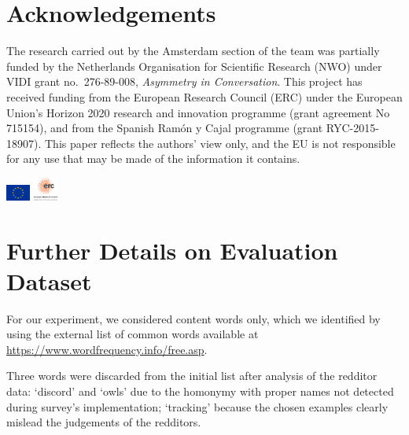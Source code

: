 \documentclass[11pt,a4paper]{article}
\begin{document}
\section*{Acknowledgements}
The research carried out by the Amsterdam section of the team was partially funded by the Netherlands Organisation for Scientific Research (NWO) under VIDI grant no.~276-89-008, {\em Asymmetry in Conversation}.
This project has received funding from the European Research Council (ERC) under the European Union’s Horizon 2020 research and innovation programme (grant agreement No 715154), and from the Spanish Ram\'on y Cajal programme (grant RYC-2015-18907). This paper reflects the authors' view only, and the EU is not responsible for any use that may be made of the information it contains.
\begin{flushright}
\includegraphics[width=0.8cm]{flag_yellow_low.jpeg}  
\includegraphics[width=0.8cm]{LOGO-ERC.jpg} 
\end{flushright}




\appendix

%
%


\section{Further Details on Evaluation Dataset}
\label{sec:further_details_data_model}

For our experiment, we considered content words only, which we identified by using the external list of common words available at \url{https://www.wordfrequency.info/free.asp}.

Three words were discarded from the initial list after analysis of the redditor data: `discord' and `owls' due to the homonymy with proper names not detected during survey's implementation; `tracking' because the chosen examples clearly mislead the judgements of the redditors.
\end{document}
